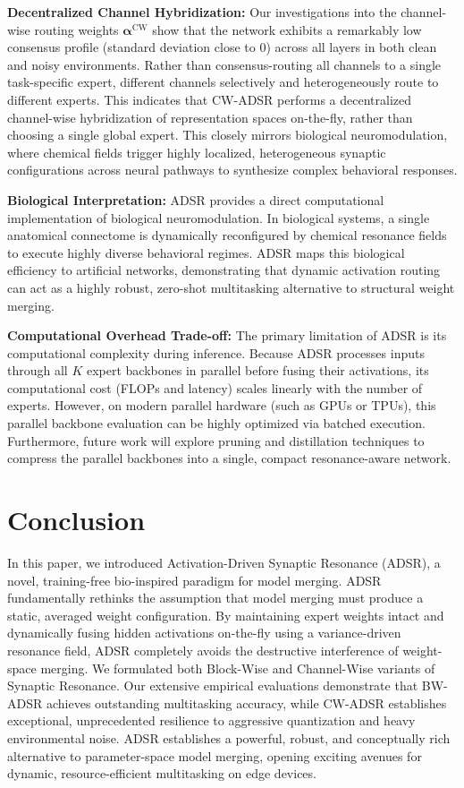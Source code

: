 \documentclass{article}
\theoremstyle{plain}
\theoremstyle{definition}
\theoremstyle{remark}
\begin{document}
\textbf{Decentralized Channel Hybridization:} Our investigations into the channel-wise routing weights $\boldsymbol{\alpha}^{\text{CW}}$ show that the network exhibits a remarkably low consensus profile (standard deviation close to $0$) across all layers in both clean and noisy environments. Rather than consensus-routing all channels to a single task-specific expert, different channels selectively and heterogeneously route to different experts. This indicates that CW-ADSR performs a decentralized channel-wise hybridization of representation spaces on-the-fly, rather than choosing a single global expert. This closely mirrors biological neuromodulation, where chemical fields trigger highly localized, heterogeneous synaptic configurations across neural pathways to synthesize complex behavioral responses.

\textbf{Biological Interpretation:} ADSR provides a direct computational implementation of biological neuromodulation. In biological systems, a single anatomical connectome is dynamically reconfigured by chemical resonance fields to execute highly diverse behavioral regimes. ADSR maps this biological efficiency to artificial networks, demonstrating that dynamic activation routing can act as a highly robust, zero-shot multitasking alternative to structural weight merging.

\textbf{Computational Overhead Trade-off:} The primary limitation of ADSR is its computational complexity during inference. Because ADSR processes inputs through all $K$ expert backbones in parallel before fusing their activations, its computational cost (FLOPs and latency) scales linearly with the number of experts. However, on modern parallel hardware (such as GPUs or TPUs), this parallel backbone evaluation can be highly optimized via batched execution. Furthermore, future work will explore pruning and distillation techniques to compress the parallel backbones into a single, compact resonance-aware network.

\section{Conclusion}
In this paper, we introduced Activation-Driven Synaptic Resonance (ADSR), a novel, training-free bio-inspired paradigm for model merging. ADSR fundamentally rethinks the assumption that model merging must produce a static, averaged weight configuration. By maintaining expert weights intact and dynamically fusing hidden activations on-the-fly using a variance-driven resonance field, ADSR completely avoids the destructive interference of weight-space merging. We formulated both Block-Wise and Channel-Wise variants of Synaptic Resonance. Our extensive empirical evaluations demonstrate that BW-ADSR achieves outstanding multitasking accuracy, while CW-ADSR establishes exceptional, unprecedented resilience to aggressive quantization and heavy environmental noise. ADSR establishes a powerful, robust, and conceptually rich alternative to parameter-space model merging, opening exciting avenues for dynamic, resource-efficient multitasking on edge devices.
\end{document}
